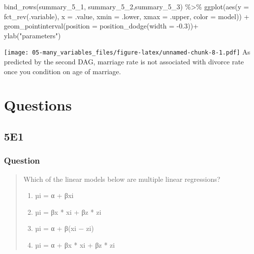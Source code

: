 \documentclass[
]{book}
\newenvironment{Shaded}{\begin{snugshade}}{\end{snugshade}}
\newcommand{\AttributeTok}[1]{\textcolor[rgb]{0.77,0.63,0.00}{#1}}
\newcommand{\FloatTok}[1]{\textcolor[rgb]{0.00,0.00,0.81}{#1}}
\newcommand{\FunctionTok}[1]{\textcolor[rgb]{0.00,0.00,0.00}{#1}}
\newcommand{\NormalTok}[1]{#1}
\newcommand{\SpecialCharTok}[1]{\textcolor[rgb]{0.00,0.00,0.00}{#1}}
\newcommand{\StringTok}[1]{\textcolor[rgb]{0.31,0.60,0.02}{#1}}
\begin{document}
\begin{Shaded}
\begin{Highlighting}[]
\FunctionTok{bind\_rows}\NormalTok{(summary\_5\_1, summary\_5\_2,summary\_5\_3) }\SpecialCharTok{\%\textgreater{}\%}
  \FunctionTok{ggplot}\NormalTok{(}\FunctionTok{aes}\NormalTok{(}\AttributeTok{y =} \FunctionTok{fct\_rev}\NormalTok{(.variable), }\AttributeTok{x =}\NormalTok{ .value, }\AttributeTok{xmin =}\NormalTok{ .lower, }\AttributeTok{xmax =}\NormalTok{ .upper, }\AttributeTok{color =}\NormalTok{ model)) }\SpecialCharTok{+}
  \FunctionTok{geom\_pointinterval}\NormalTok{(}\AttributeTok{position =} \FunctionTok{position\_dodge}\NormalTok{(}\AttributeTok{width =} \SpecialCharTok{{-}}\FloatTok{0.3}\NormalTok{))}\SpecialCharTok{+}
  \FunctionTok{ylab}\NormalTok{(}\StringTok{"parameters"}\NormalTok{)}
\end{Highlighting}
\end{Shaded}

\texttt{[image: 05-many\_variables\_files/figure-latex/unnamed-chunk-8-1.pdf]}
As predicted by the second DAG, marriage rate is not associated with divorce rate once you condition on age of marriage.

\hypertarget{questions-4}{%
\section{Questions}\label{questions-4}}

\hypertarget{e1-3}{%
\subsection*{5E1}\label{e1-3}}

\hypertarget{question-45}{%
\subsubsection*{Question}\label{question-45}}

\begin{quote}
Which of the linear models below are multiple linear regressions?

\begin{enumerate}
\def\labelenumi{(\arabic{enumi})}
\item
  µi = α + βxi
\item
  µi = βx * xi + βz * zi
\item
  µi = α + β(xi − zi)
\item
  µi = α + βx * xi + βz * zi
\end{enumerate}
\end{quote}
\end{document}
